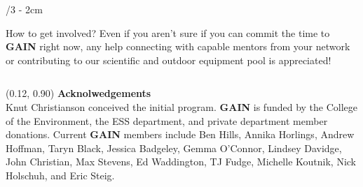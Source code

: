 \documentclass[landscape]{uwposter}
\begin{document}
\begin{frame}
\begin{columns}[onlytextwidth]
\begin{column}{\textwidth/3 - 2cm}
\begin{alertblock}{How to get involved?}
        Even if you aren't sure if you can commit the time to \textbf{\alert{GAIN}} right now, any help connecting with capable mentors from your network or contributing to our scientific and outdoor equipment pool is appreciated!
        
    \end{alertblock}

\end{column}


\end{columns}


\begin{textblock}{0.76}(0.12, 0.90)
    \color{white}
    \sffamily
    \textbf{Acknolwedgements}
    \\
    Knut Christianson conceived the initial program. \textbf{\alert{GAIN}} is funded by the College of the Environment, the ESS department, and private department member donations.  
    Current \textbf{\alert{GAIN}} members include Ben Hills, Annika Horlings, Andrew Hoffman, Taryn Black, Jessica Badgeley, Gemma O'Connor, Lindsey Davidge, John Christian,  Max Stevens, Ed Waddington, TJ Fudge, Michelle Koutnik, Nick Holschuh, and Eric Steig.
    \end{textblock}


\end{frame}
\end{document}
